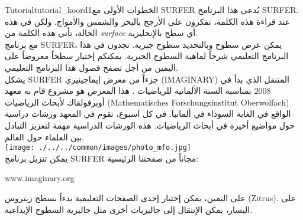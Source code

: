\begin{surferIntroPage}{Tutorial}{tutorial_koord1}{الخطوات الأولى مع SURFER}
يُدعى هذا البرنامج SURFER. عند قراءة هذه الكلمة، تفكرون على الأرجح بالبحر والشمس والأمواج. ولكن في هذه الحالة، تأتي هذه الكلمة من {\it surface} أي سطح بالإنجليزية.
\\
مع برنامج SURFER، يمكن عرض سطوح وبالتحديد سطوح جبرية. تجدون في هذا البرنامج التعليمي شرحاً لماهية السطوح الجبرية. يمكنكم إختيار سطحاً معروضاً على اليمين من أجل تصفح فصول هذا البرنامج التعليمي.\\
يشكل SURFER جزءاً من معرض إيماجينيري (IMAGINARY) المتنقل الذي بدأ في 2008 بمناسبة السنة الألمانية للرياضيات . هذا المعرض هو مشروع قام به معهد أوبرفولفاك لأبحاث الرياضيات (Mathematisches Forschungsinstitut Oberwolfach) الواقع في الغابة السوداء في ألمانيا. في كل اسبوع، تقوم في المعهد ورشات دراسية حول مواضيع أخيرة في أبحاث الرياضيات. هذه الورشات الدراسية مهمة لتعزيز التبادل بين العلماء حول العالم. \\
\vspace{0.2cm} \hspace{3.5cm}\texttt{[image: ./../../common/images/photo\_mfo.jpg]}\\
يمكن تنزيل برنامج SURFER مجاناً من صفحتنا الرئيسية: \\
\begin{centering}
www.imaginary.org\\
\end{centering}
 \vspace{0.2cm}
على اليمين، يمكن إختيار إحدى الصفحات التعليمية بدءاً بسطح زيتروس (Zitrus). على اليسار، يمكن الإنتقال إلى جاليريات أخرى مثل جاليرية السطوح الإبداعية.
\end{surferIntroPage}

